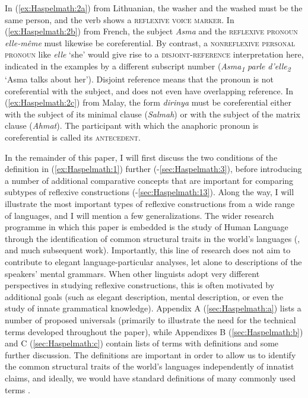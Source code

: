 \documentclass[output=paper]{langscibook}
\begin{document}
    
In (\ref{ex:Haspelmath:2a}) from Lithuanian, the washer and the washed must be the same person, and the verb shows a \textsc{reflexive} \textsc{voice} \textsc{marker}. In (\ref{ex:Haspelmath:2b}) from French, the subject \textit{Asma} and the \textsc{reflexive} \textsc{pronoun} \textit{elle-même} must likewise be coreferential. By contrast, a \textsc{nonreflexive} \textsc{personal} \textsc{pronoun} like \textit{elle} ‘she’ would give rise to a \textsc{disjoint-reference} interpretation here, indicated in the examples by a different subscript number (\textit{Asma\textsubscript{1}} \textit{parle} \textit{d’elle\textsubscript{2}} ‘Asma talks about her’). Disjoint reference means that the pronoun is not coreferential with the subject, and does not even have overlapping reference. In (\ref{ex:Haspelmath:2c}) from Malay, the form \textit{dirinya} must be coreferential either with the subject of its minimal clause (\textit{Salmah}) or with the subject of the matrix clause (\textit{Ahmat}). The participant with which the anaphoric pronoun is coreferential is called its \textsc{antecedent}.

  In the remainder of this paper, I will first discuss the two conditions of the definition in (\ref{ex:Haspelmath:1}) further (-\ref{sec:Haspelmath:3}), before introducing a number of additional comparative concepts that are important for comparing subtypes of reflexive constructions (-\ref{sec:Haspelmath:13}). Along the way, I will illustrate the most important types of reflexive constructions from a wide range of languages, and I will mention a few generalizations. The wider research programme in which this paper is embedded is the study of Human Language through the identification of common structural traits in the world’s languages (\citealt{Greenberg1963}, and much subsequent work). Importantly, this line of research does not aim to contribute to elegant language-particular analyses, let alone to descriptions of the speakers’ mental grammars. When other linguists adopt very different perspectives in studying reflexive constructions, this is often motivated by additional goals (such as elegant description, mental description, or even the study of innate grammatical knowledge). Appendix A (\ref{sec:Haspelmath:a}) lists a number of proposed universals (primarily to illustrate the need for the technical terms developed throughout the paper), while Appendixes B (\ref{sec:Haspelmath:b}) and C (\ref{sec:Haspelmath:c}) contain lists of terms with definitions and some further discussion. The definitions are important in order to allow us to identify the common structural traits of the world’s languages independently of innatist claims, and ideally, we would have standard definitions of many commonly used terms \citep{Haspelmath2020}.
\end{document}
